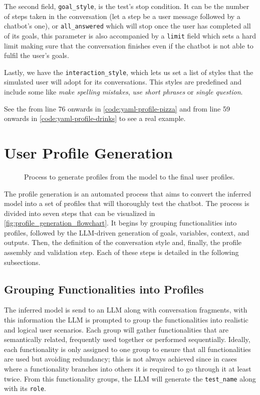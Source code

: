 The second field, \texttt{goal\_style}, is the test's stop condition.
It can be the number of steps taken in the conversation
(let a step be a user message followed by a chatbot's one),
or \texttt{all\_answered} which will stop once the user has completed all of its goals,
this parameter is also accompanied by a \texttt{limit} field which sets a hard limit
making sure that the conversation finishes even if the chatbot is not able to fulfil the user's goals.

Lastly, we have the \texttt{interaction\_style},
which lets us set a list of styles that the simulated user will adopt for its conversations.
This styles are predefined and include some like
\textit{make spelling mistakes}, \textit{use short phrases}
or \textit{single question}.

See the from line 76 onwards in \autoref{code:yaml-profile-pizza}
and from line 59 onwards in \autoref{code:yaml-profile-drinks}
to see a real example.

\section{User Profile Generation}\label{sec:profile-generation}

\begin{figure}[htpb]
    \centering
    
    \caption{Process to generate profiles from the model to the final user profiles.}
    \label{fig:profile_generation_flowchart}
\end{figure}

The profile generation is an automated process
that aims to convert the inferred model
into a set of profiles that will thoroughly test the chatbot.
The process is divided into seven steps that can be visualized in \autoref{fig:profile_generation_flowchart}.
It begins by
grouping functionalities into profiles,
followed by the \ac{LLM}-driven generation of goals, variables, context, and outputs.
Then, the definition of the conversation style and,
finally, the profile assembly and validation step.
Each of these steps is detailed in the following subsections.

\subsection{Grouping Functionalities into Profiles}

The inferred model is send to an \ac{LLM} along with conversation fragments,
with this information the \ac{LLM} is prompted to
group the functionalities into realistic and logical user scenarios.
Each group will gather functionalities that are semantically related,
frequently used together or performed sequentially.
Ideally, each functionality is only assigned to one group
to ensure that all functionalities are used but avoiding redundancy;
this is not always achieved since in cases where a functionality branches into others
it is required to go through it at least twice.
From this functionality groups, the \ac{LLM} will generate
the \texttt{test\_name} along with its \texttt{role}.


